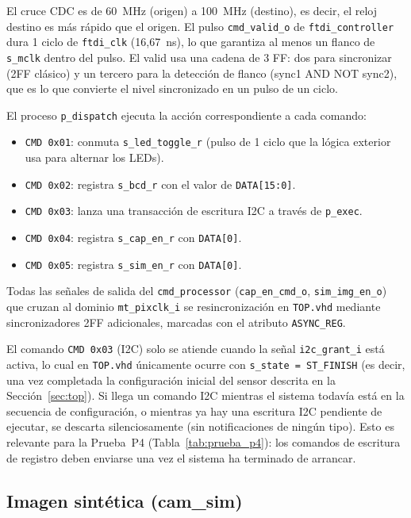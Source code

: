 \documentclass[../main.tex]{subfiles}
\begin{document}
El cruce \ac{CDC} es de 60~MHz (origen) a 100~MHz (destino), es decir, el reloj destino es más rápido que el origen. El pulso \texttt{cmd\_valid\_o} de \texttt{ftdi\_controller} dura 1 ciclo de \texttt{ftdi\_clk} (16{,}67~ns), lo que garantiza al menos un flanco de \texttt{s\_mclk} dentro del pulso. El valid usa una cadena de 3 FF: dos para sincronizar (2FF clásico) y un tercero para la detección de flanco (sync1 AND NOT sync2), que es lo que convierte el nivel sincronizado en un pulso de un ciclo.

El proceso \texttt{p\_dispatch} ejecuta la acción correspondiente a cada comando:

\begin{itemize}
    \item \texttt{CMD 0x01}: conmuta \texttt{s\_led\_toggle\_r} (pulso de 1 ciclo que la lógica exterior usa para alternar los LEDs).
    \item \texttt{CMD 0x02}: registra \texttt{s\_bcd\_r} con el valor de \texttt{DATA[15:0]}.
    \item \texttt{CMD 0x03}: lanza una transacción de escritura \ac{I2C} a través de \texttt{p\_exec}.
    \item \texttt{CMD 0x04}: registra \texttt{s\_cap\_en\_r} con \texttt{DATA[0]}.
    \item \texttt{CMD 0x05}: registra \texttt{s\_sim\_en\_r} con \texttt{DATA[0]}.
\end{itemize}

Todas las señales de salida del \texttt{cmd\_processor} (\texttt{cap\_en\_cmd\_o}, \texttt{sim\_img\_en\_o}) que cruzan al dominio \texttt{mt\_pixclk\_i} se resincronización en \texttt{TOP.vhd} mediante sincronizadores 2FF adicionales, marcadas con el atributo \texttt{ASYNC\_REG}.

El comando \texttt{CMD 0x03} (I2C) solo se atiende cuando la señal \texttt{i2c\_grant\_i} está activa, lo cual en \texttt{TOP.vhd} únicamente ocurre con \texttt{s\_state = ST\_FINISH} (es decir, una vez completada la configuración inicial del sensor descrita en la Sección~\ref{sec:top}). Si llega un comando I2C mientras el sistema todavía está en la secuencia de configuración, o mientras ya hay una escritura I2C pendiente de ejecutar, se descarta silenciosamente (sin notificaciones de ningún tipo). Esto es relevante para la Prueba~P4 (Tabla~\ref{tab:prueba_p4}): los comandos de escritura de registro deben enviarse una vez el sistema ha terminado de arrancar.

\subsection{Imagen sintética (cam\_sim)}
\label{sec:cam_sim}
\end{document}

